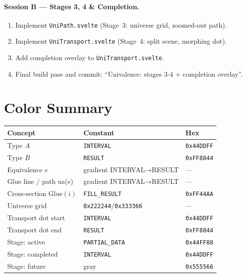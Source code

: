 \documentclass[11pt,a4paper]{article}
\begin{document}
\paragraph{Session B — Stages 3, 4 \& Completion.}
\begin{enumerate}
  \item Implement \texttt{UniPath.svelte} (Stage~3: universe grid, zoomed-out path).
  \item Implement \texttt{UniTransport.svelte} (Stage~4: split scene, morphing dot).
  \item Add completion overlay to \texttt{UniTransport.svelte}.
  \item Final build pass and commit: ``Univalence: stages 3-4 + completion overlay''.
\end{enumerate}

\section{Color Summary}

\begin{center}
\begin{tabular}{lll}
\toprule
\textbf{Concept} & \textbf{Constant} & \textbf{Hex} \\\midrule
Type $A$ & \texttt{INTERVAL} & \texttt{0x44DDFF} \\
Type $B$ & \texttt{RESULT}   & \texttt{0xFF8844} \\
Equivalence $e$ & gradient INTERVAL→RESULT & --- \\
Glue line / path ua(e) & gradient INTERVAL→RESULT & --- \\
Cross-section $\mathrm{Glue}(i)$ & \texttt{FILL\_RESULT} & \texttt{0xFF44AA} \\
Universe grid & \texttt{0x222244}/\texttt{0x333366} & --- \\
Transport dot start & \texttt{INTERVAL} & \texttt{0x44DDFF} \\
Transport dot end & \texttt{RESULT} & \texttt{0xFF8844} \\
Stage: active & \texttt{PARTIAL\_DATA} & \texttt{0x44FF88} \\
Stage: completed & \texttt{INTERVAL} & \texttt{0x44DDFF} \\
Stage: future & gray & \texttt{0x555566} \\
\bottomrule
\end{tabular}
\end{center}
\end{document}
